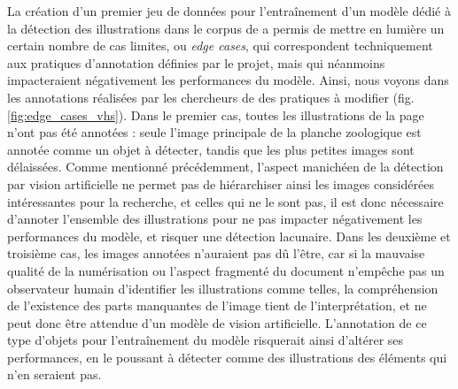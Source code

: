 	La création d'un premier jeu de données pour l'entraînement d'un modèle dédié à la détection des illustrations dans le corpus de \vhs a permis de mettre en lumière un certain nombre de cas limites, ou \textit{edge cases}, qui correspondent techniquement aux pratiques d'annotation définies par le projet, mais qui néanmoins impacteraient négativement les performances du modèle. Ainsi, nous voyons dans les annotations réalisées par les chercheurs de \vhs des pratiques à modifier (fig. \ref{fig:edge_cases_vhs}). Dans le premier cas, toutes les illustrations de la page n'ont pas été annotées : seule l'image principale de la planche zoologique est annotée comme un objet à détecter, tandis que les plus petites images sont délaissées. Comme mentionné précédemment, l'aspect manichéen de la détection par vision artificielle ne permet pas de hiérarchiser ainsi les images considérées intéressantes pour la recherche, et celles qui ne le sont pas, il est donc nécessaire d'annoter l'ensemble des illustrations pour ne pas impacter négativement les performances du modèle, et risquer une détection lacunaire. Dans les deuxième et troisième cas, les images annotées n'auraient pas dû l'être, car si la mauvaise qualité de la numérisation ou l'aspect fragmenté du document n'empêche pas un observateur humain d'identifier les illustrations comme telles, la compréhension de l'existence des parts manquantes de l'image tient de l'interprétation, et ne peut donc être attendue d'un modèle de vision artificielle. L'annotation de ce type d'objets pour l'entraînement du modèle risquerait ainsi d'altérer ses performances, en le poussant à détecter comme des illustrations des éléments qui n'en seraient pas.

